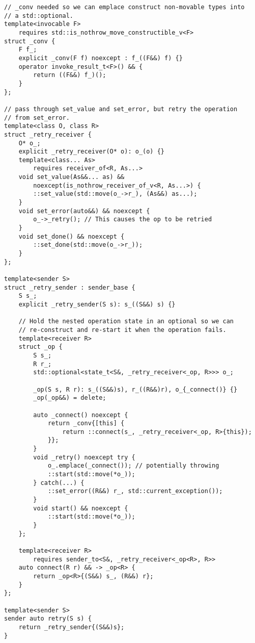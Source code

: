 \documentclass[a4paper,12pt,notitlepage,twoside,openright]{article}
\begin{document}
\begin{verbatim}
// _conv needed so we can emplace construct non-movable types into
// a std::optional.
template<invocable F>
    requires std::is_nothrow_move_constructible_v<F>
struct _conv {
    F f_;
    explicit _conv(F f) noexcept : f_((F&&) f) {}
    operator invoke_result_t<F>() && {
        return ((F&&) f_)();
    }
};

// pass through set_value and set_error, but retry the operation
// from set_error.
template<class O, class R>
struct _retry_receiver {
    O* o_;
    explicit _retry_receiver(O* o): o_(o) {}
    template<class... As>
        requires receiver_of<R, As...>
    void set_value(As&&... as) &&
        noexcept(is_nothrow_receiver_of_v<R, As...>) {
        ::set_value(std::move(o_->r_), (As&&) as...);
    }
    void set_error(auto&&) && noexcept {
        o_->_retry(); // This causes the op to be retried
    }
    void set_done() && noexcept {
        ::set_done(std::move(o_->r_));
    }
};

template<sender S>
struct _retry_sender : sender_base {
    S s_;
    explicit _retry_sender(S s): s_((S&&) s) {}

    // Hold the nested operation state in an optional so we can
    // re-construct and re-start it when the operation fails.
    template<receiver R>
    struct _op {
        S s_;
        R r_;
        std::optional<state_t<S&, _retry_receiver<_op, R>>> o_;

        _op(S s, R r): s_((S&&)s), r_((R&&)r), o_{_connect()} {}
        _op(_op&&) = delete;

        auto _connect() noexcept {
            return _conv{[this] {
                return ::connect(s_, _retry_receiver<_op, R>{this});
            }};
        }
        void _retry() noexcept try {
            o_.emplace(_connect()); // potentially throwing
            ::start(std::move(*o_));
        } catch(...) {
            ::set_error((R&&) r_, std::current_exception());
        }
        void start() && noexcept {
            ::start(std::move(*o_));
        }
    };

    template<receiver R>
        requires sender_to<S&, _retry_receiver<_op<R>, R>>
    auto connect(R r) && -> _op<R> {
        return _op<R>{(S&&) s_, (R&&) r};
    }
};

template<sender S>
sender auto retry(S s) {
    return _retry_sender{(S&&)s};
}
\end{verbatim}
\end{document}
